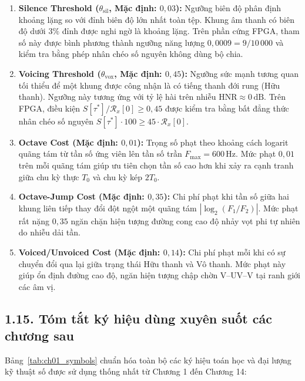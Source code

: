 \begin{enumerate}[leftmargin=1.4em]
    \item \textbf{Silence Threshold ($\theta_{\mathrm{sil}}$, Mặc định: $0{,}03$):} Ngưỡng biên độ phân định khoảng lặng so với đỉnh biên độ lớn nhất toàn tệp. Khung âm thanh có biên độ dưới $3\%$ đỉnh được nghi ngờ là khoảng lặng. Trên phần cứng FPGA, tham số này được bình phương thành ngưỡng năng lượng $0{,}0009 = 9 / 10\,000$ và kiểm tra bằng phép nhân chéo số nguyên không dùng bộ chia.
    \item \textbf{Voicing Threshold ($\theta_{\mathrm{vox}}$, Mặc định: $0{,}45$):} Ngưỡng sức mạnh tương quan tối thiểu để một khung được công nhận là có tiếng thanh đới rung (Hữu thanh). Ngưỡng này tương ứng với tỷ lệ hài trên nhiễu $\text{HNR} \approx 0\,\text{dB}$. Trên FPGA, điều kiện $S[\tau^*] / \mathcal{R}_x[0] \ge 0{,}45$ được kiểm tra bằng bất đẳng thức nhân chéo số nguyên $S[\tau^*] \cdot 100 \ge 45 \cdot \mathcal{R}_x[0]$.
    \item \textbf{Octave Cost (Mặc định: $0{,}01$):} Trọng số phạt theo khoảng cách logarit quãng tám từ tần số ứng viên lên tần số trần $F_{\max} = 600\,\text{Hz}$. Mức phạt $0{,}01$ trên mỗi quãng tám giúp ưu tiên chọn tần số cao hơn khi xảy ra cạnh tranh giữa chu kỳ thực $T_0$ và chu kỳ kép $2T_0$.
    \item \textbf{Octave-Jump Cost (Mặc định: $0{,}35$):} Chi phí phạt khi tần số giữa hai khung liên tiếp thay đổi đột ngột một quãng tám $|\log_2(F_1/F_2)|$. Mức phạt rất nặng $0{,}35$ ngăn chặn hiện tượng đường cong cao độ nhảy vọt phi tự nhiên do nhiễu dải tần.
    \item \textbf{Voiced/Unvoiced Cost (Mặc định: $0{,}14$):} Chi phí phạt mỗi khi có sự chuyển đổi qua lại giữa trạng thái Hữu thanh và Vô thanh. Mức phạt này giúp ổn định đường cao độ, ngăn hiện tượng chập chờn V--UV--V tại ranh giới các âm vị.
\end{enumerate}

\subsection*{1.15. Tóm tắt ký hiệu dùng xuyên suốt các chương sau}

Bảng~\ref{tab:ch01_symbols} chuẩn hóa toàn bộ các ký hiệu toán học và đại lượng kỹ thuật số được sử dụng thống nhất từ Chương 1 đến Chương 14:


